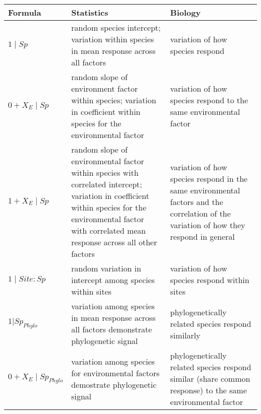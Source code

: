 \begin{tabularx}{\textwidth}{|l|X|X|}
\hline
Formula & Statistics & Biology \\
\hline
$1 \mid Sp$ &
random species intercept; variation within species in mean response across all factors &
variation of how species respond \\
\hline

$0 + X_{E} \mid Sp$ &
random slope of environment factor within species; variation in coefficient within species for the environmental factor &
variation of how species respond to the same environmental factor \\
\hline

$1 + X_{E} \mid Sp$ &
random slope of environmental factor within species with correlated intercept; variation in coefficient within species for the environmental factor with correlated mean response across all other factors &
variation of how species respond in the same environmental factors and the correlation of the variation of how they respond in general \\
\hline

$1 \mid Site:Sp $ &
random variation in intercept among species within sites &
variation of how species respond within sites \\
\hline

$1 | Sp_{Phylo} $ &
variation among species in mean response across all factors demonstrate phylogenetic signal &
phylogenetically related species respond similarly \\
\hline

$0 + X_{E} \mid Sp_{Phylo}$ &
variation among species for environmental factors demostrate phylogenetic signal &
phylogenetically related species respond similar (share common response) to the same environmental factor \\
\hline
\end{tabularx}
            
                                                                        

